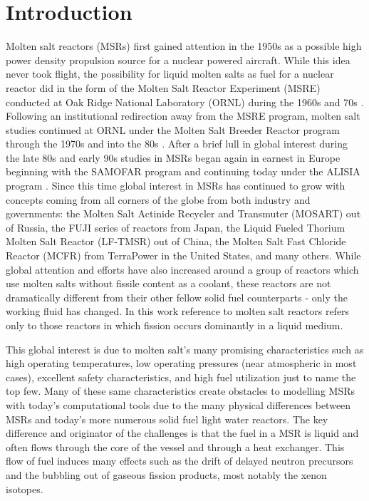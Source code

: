 \chapter{Introduction}\label{ch:intro}

Molten salt reactors (MSRs) first gained attention in the 1950s as a possible
high power density propulsion source for a nuclear powered aircraft. While this
idea never took flight, the possibility for liquid molten salts as fuel for a
nuclear reactor did in the form of the Molten Salt Reactor Experiment (MSRE)
conducted at Oak Ridge National Laboratory (ORNL) during the 1960s and 70s 
\cite{ORNL}. Following an institutional redirection away from the MSRE
program, molten salt studies continued at ORNL under the Molten Salt Breeder
Reactor program through the 1970s and into the 80s \cite{ORNL}. After a
brief lull in global interest during the late 80s and early 90s studies in MSRs
began again in earnest in Europe beginning with the SAMOFAR program and continuing
today under the ALISIA program \cite{SAMOFAR}. Since this time global interest
in MSRs has continued to grow with concepts coming from all corners of the
globe from both industry and governments: the Molten Salt Actinide Recycler and
Transmuter (MOSART) out of Russia, the FUJI series of reactors from Japan, 
the Liquid Fueled Thorium Molten Salt Reactor (LF-TMSR)  out of China, the
Molten Salt Fast Chloride Reactor (MCFR) from TerraPower in the United States,
and many others. While global attention and efforts have also increased around
a group of reactors which use molten salts without fissile content as a coolant,
these reactors are not dramatically different from their other fellow solid
fuel counterparts - only the working fluid has changed. In this work reference
to molten salt reactors refers only to those reactors in which fission occurs
dominantly in a liquid medium.

This global interest is due to molten salt's many promising characteristics such
as high operating temperatures, low operating pressures (near atmospheric in
most cases), excellent safety characteristics, and high fuel utilization just
to name the top few. Many of these same characteristics create obstacles to 
modelling MSRs with today's computational tools due to the many physical
differences between MSRs and today's more numerous solid fuel light water
reactors. The key difference and originator of the challenges is that the fuel
in a MSR is liquid and often flows through the core of the vessel and through
a heat exchanger. This flow of fuel induces many effects such as the drift of
delayed neutron precursors and the bubbling out of gaseous fission products,
most notably the xenon isotopes.

